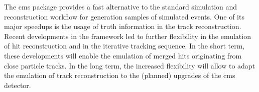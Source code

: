 The \gls{cms} \FSIM package provides a fast alternative to the standard simulation and reconstruction workflow for generation samples of simulated events. One of its major speedups is the usage of truth information in the track reconstruction. Recent developments in the framework led to further flexibility in the emulation of hit reconstruction and in the iterative tracking sequence. In the short term, these developments will enable the emulation of merged hits originating from close particle tracks. In the long term, the increased flexibility will allow to adapt the emulation of track reconstruction to the (planned) upgrades of the \gls{cms} detector.



